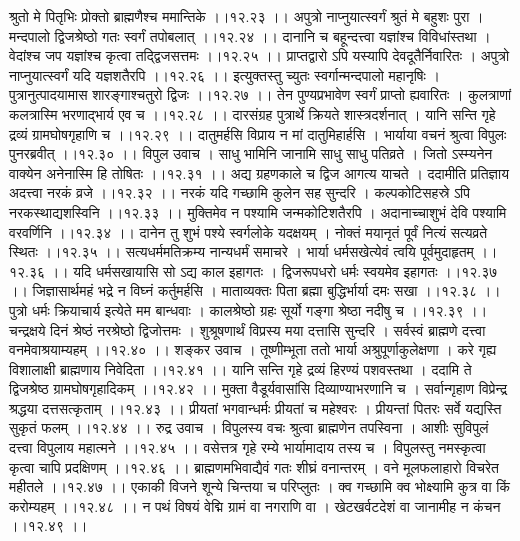 \documentclass[11pt]{book}
\begin{document}
\begin{landscape}
श्रुतो मे पितृभिः प्रोक्तो ब्राह्मणैश्च ममान्तिके ।।१२.२३ ।।
अपुत्रो नाप्नुयात्स्वर्गं श्रुतं मे बहुशः पुरा ।
मन्दपालो द्विजश्रेष्ठो गतः स्वर्गं तपोबलात् ।।१२.२४ ।।
दानानि च बहून्दत्त्वा यज्ञांश्च विविधांस्तथा ।
वेदांश्च जप यज्ञांश्च कृत्वा तद्द्विजसत्तमः ।।१२.२५ ।।
प्राप्तद्वारो ऽपि यस्यापि देवदूतैर्निवारितः ।
अपुत्रो नाप्नुयात्स्वर्गं यदि यज्ञशतैरपि ।।१२.२६ ।।
इत्युक्तस्तु च्युतः स्वर्गान्मन्दपालो महानृषिः ।
पुत्रानुत्पादयामास शारङ्गाश्चतुरो द्विजः ।।१२.२७ ।।
तेन पुण्यप्रभावेण स्वर्गं प्राप्तो ह्यवारितः ।
कुलत्राणां कलत्रास्मि भरणाद्भार्य एव च ।।१२.२८ ।।
दारसंग्रह पुत्रार्थे क्रियते शास्त्रदर्शनात् ।
यानि सन्ति गृहे द्रव्यं ग्रामघोषगृहाणि च ।।१२.२९ ।।
दातुमर्हसि विप्राय न मां दातुमिहार्हसि ।
भार्याया वचनं श्रुत्वा विपुलः पुनरब्रवीत् ।।१२.३० ।।
विपुल उवाच ।
साधु भामिनि जानामि साधु साधु पतिव्रते ।
जितो ऽस्म्यनेन वाक्येन अनेनास्मि हि तोषितः ।।१२.३१ ।।
अद्य ग्रहणकाले च द्विज आगत्य याचते ।
ददामीति प्रतिज्ञाय अदत्त्वा नरकं व्रजे ।।१२.३२ ।।
नरकं यदि गच्छामि कुलेन सह सुन्दरि ।
कल्पकोटिसहस्रे ऽपि नरकस्थाद्यशस्विनि ।।१२.३३ ।।
मुक्तिमेव न पश्यामि जन्मकोटिशतैरपि ।
अदानाच्चाशुभं देवि पश्यामि वरवर्णिनि ।।१२.३४ ।।
दानेन तु शुभं पश्ये स्वर्गलोके यदक्षयम् ।
नोक्तं मयानृतं पूर्वं नित्यं सत्यव्रते स्थितः ।।१२.३५ ।।
सत्यधर्ममतिक्रम्य नान्यधर्मं समाचरे ।
भार्या धर्मसखेत्येवं त्वयि पूर्वमुदाहृतम् ।।१२.३६ ।।
यदि धर्मसखायासि सो ऽद्य काल इहागतः ।
द्विजरूपधरो धर्मः स्वयमेव इहागतः ।।१२.३७ ।।
जिज्ञासार्थमहं भद्रे न विघ्नं कर्तुमर्हसि ।
माताव्यक्तः पिता ब्रह्मा बुद्धिर्भार्या दमः सखा ।।१२.३८ ।।
पुत्रो धर्मः क्रियाचार्य इत्येते मम बान्धवाः ।
कालश्रेष्ठो ग्रहः सूर्यो गङ्गा श्रेष्ठा नदीषु च ।।१२.३९ ।।
चन्द्रक्षये दिनं श्रेष्ठं नरश्रेष्ठो द्विजोत्तमः ।
शुश्रूषणार्थं विप्रस्य मया दत्तासि सुन्दरि ।
सर्वस्वं ब्राह्मणे दत्त्वा वनमेवाश्रयाम्यहम् ।।१२.४० ।।
शङ्कर उवाच ।
तूष्णीम्भूता ततो भार्या अश्रुपूर्णाकुलेक्षणा ।
करे गृह्य विशालाक्षी ब्राह्मणाय निवेदिता ।।१२.४१ ।।
यानि सन्ति गृहे द्रव्यं हिरण्यं पशवस्तथा ।
ददामि ते द्विजश्रेष्ठ ग्रामघोषगृहादिकम् ।।१२.४२ ।।
मुक्ता वैडूर्यवासांसि दिव्याण्याभरणानि च ।
सर्वान्गृहाण विप्रेन्द्र श्रद्धया दत्तसत्कृताम् ।।१२.४३ ।।
प्रीयतां भगवान्धर्मः प्रीयतां च महेश्वरः ।
प्रीयन्तां पितरः सर्वे यद्यस्ति सुकृतं फलम् ।।१२.४४ ।।
रुद्र उवाच ।
विपुलस्य वचः श्रुत्वा ब्राह्मणेन तपस्विना ।
आशीः सुविपुलं दत्त्वा विपुलाय महात्मने ।।१२.४५ ।।
वसेत्तत्र गृहे रम्ये भार्यामादाय तस्य च ।
विपुलस्तु नमस्कृत्वा कृत्वा चापि प्रदक्षिणम् ।।१२.४६ ।।
ब्राह्मणमभिवाद्यैवं गतः शीघ्रं वनान्तरम् ।
वने मूलफलाहारो विचरेत महीतले ।।१२.४७ ।।
एकाकी विजने शून्ये चिन्तया च परिप्लुतः ।
क्व गच्छामि क्व भोक्ष्यामि कुत्र वा किं करोम्यहम् ।।१२.४८ ।।
न पथं विषयं वेद्मि ग्रामं वा नगराणि वा ।
खेटखर्वटदेशं वा जानामीह न कंचन ।।१२.४९ ।।

\end{landscape}
\end{document}
